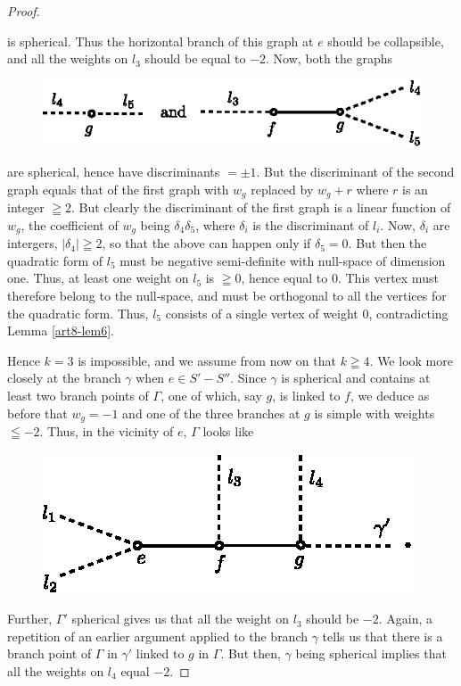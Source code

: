 \begin{proof}
\begin{figure}[H]
\end{figure}
\noindent
is spherical. Thus the horizontal branch of this graph at $e$ should be collapsible, and all the weights on $l_3$ should be equal to $-2$. Now, both the graphs
\begin{figure}[H]
\centering
\includegraphics{fig20.eps}
\end{figure}\pageoriginale
\noindent
are spherical, hence have discriminants $=\pm 1$. But the discriminant of the second graph equals that of the first graph with $w_g$ replaced by $w_g+r$ where $r$ is an integer $\geqq 2$. But clearly the discriminant of the first graph is a linear function of $w_g$, the coefficient of $w_g$ being $\delta_4 \delta_5$, where $\delta_i$ is the discriminant of $l_i$. Now, $\delta_i$ are intergers, $|\delta_4| \geqq 2$, so that the above can happen only if $\delta_5=0$. But then the quadratic form of $l_5$ must be negative semi-definite with null-space of dimension one. Thus, at least one weight on $l_5$ is $\geqq 0$, hence equal to 0. This vertex must therefore belong to the null-space, and must be orthogonal to all the vertices for the quadratic form. Thus, $l_5$ consists of a single vertex of weight 0, contradicting Lemma \ref{art8-lem6}. 

Hence $k= 3$ is impossible, and we assume from now on that $k \geqq 4$. We look more closely at the branch $\gamma$ when $e \in S' - S''$. Since $\gamma$ is spherical and contains at least two branch points of $\Gamma$, one of which, say $g$, is linked to $f$, we deduce as before that $w_g = -1$ and one of the three branches at $g$ is simple with weights $\leqq -2$. Thus, in the vicinity of $e$, $\Gamma$ looks like
\begin{figure}[H]
\centering
\includegraphics{fig21.eps}
\end{figure}
\noindent
Further, $\Gamma'$ spherical gives us that all the weight on $l_3$ should be $-2$. Again, a repetition of an earlier argument applied to the branch $\gamma$ tells us that there is a branch point of $\Gamma$ in $\gamma'$ linked to $g$ in $\Gamma$. But then, $\gamma$ being spherical implies that all the weights on $l_4$ equal $-2$.


\end{proof}
